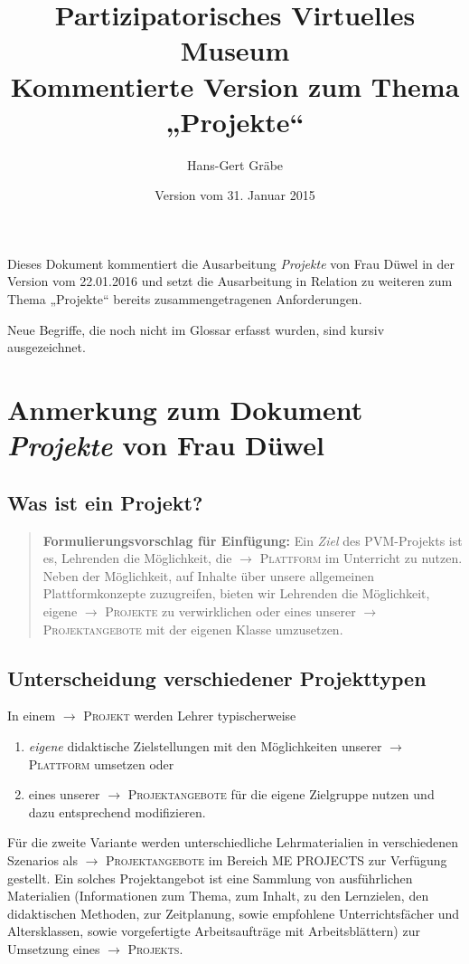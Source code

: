 \documentclass[a4paper,11pt]{article}
\title{Partizipatorisches Virtuelles Museum\\[.6em]
  Kommentierte Version zum Thema „Projekte“}
\date{Version vom 31. Januar 2015}
\author{Hans-Gert Gräbe}
\newcommand{\FV}[1]{
  \begin{quote}\textbf{Formulierungsvorschlag für Einfügung:} #1 \end{quote}
}
\newcommand{\glossar}[1]{{$\to$ \textsc{#1}}}
\begin{document}
\maketitle

Dieses Dokument kommentiert die Ausarbeitung \emph{Projekte} von Frau Düwel in
der Version vom 22.01.2016 und setzt die Ausarbeitung in Relation zu weiteren
zum Thema „Projekte“ bereits zusammengetragenen Anforderungen. 

Neue Begriffe, die noch nicht im Glossar erfasst wurden, sind kursiv
ausgezeichnet.

\section{Anmerkung zum Dokument \emph{Projekte} von Frau Düwel} 

\subsection{Was ist ein Projekt?}

\FV{Ein \emph{Ziel} des PVM-Projekts ist es, Lehrenden die Möglichkeit, die
  \glossar{Plattform} im Unterricht zu nutzen.  Neben der Möglichkeit, auf
  Inhalte über unsere allgemeinen Plattformkonzepte zuzugreifen, bieten wir
  Lehrenden die Möglichkeit, eigene \glossar{Projekte} zu verwirklichen oder
  eines unserer \glossar{Projektangebote} mit der eigenen Klasse umzusetzen. }

\subsection{Unterscheidung verschiedener Projekttypen}

In einem \glossar{Projekt} werden Lehrer typischerweise 
\begin{enumerate}
\item \emph{eigene} didaktische Zielstellungen mit den Möglichkeiten unserer
  \glossar{Plattform} umsetzen oder
\item eines unserer \glossar{Projektangebote} für die eigene Zielgruppe nutzen
  und dazu entsprechend modifizieren.
\end{enumerate}

Für die zweite Variante werden unterschiedliche Lehrmaterialien in
verschiedenen Szenarios als \glossar{Projektangebote} im Bereich ME PROJECTS
zur Verfügung gestellt. Ein solches Projektangebot ist eine Sammlung von
ausführlichen Materialien (Informationen zum Thema, zum Inhalt, zu den
Lernzielen, den didaktischen Methoden, zur Zeitplanung, sowie empfohlene
Unterrichtsfächer und Altersklassen, sowie vorgefertigte Arbeitsaufträge mit
Arbeitsblättern) zur Umsetzung eines \glossar{Projekts}.
\end{document}
